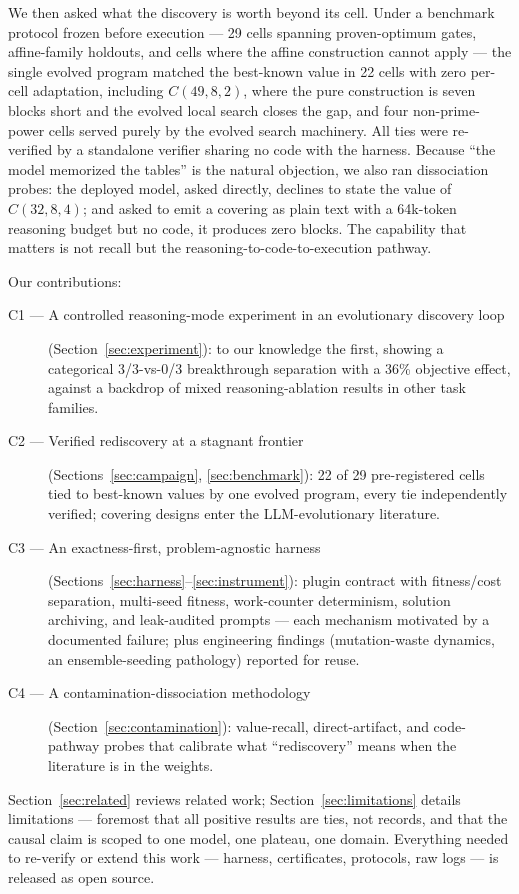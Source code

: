 We then asked what the discovery is worth beyond its cell. Under a
benchmark protocol frozen before execution --- 29 cells spanning
proven-optimum gates, affine-family holdouts, and cells where the
affine construction cannot apply --- the single evolved program
matched the best-known value in 22 cells with zero per-cell
adaptation, including $C(49,8,2)$, where the pure construction is
seven blocks short and the evolved local search closes the gap, and
four non-prime-power cells served purely by the evolved search
machinery. All ties were re-verified by a standalone verifier
sharing no code with the harness. Because ``the model memorized the
tables'' is the natural objection, we also ran dissociation probes:
the deployed model, asked directly, declines to state the value of
$C(32,8,4)$; and asked to emit a covering as plain text with a
64k-token reasoning budget but no code, it produces zero blocks. The
capability that matters is not recall but the
reasoning-to-code-to-execution pathway.

Our contributions:

\begin{description}
\item[C1 --- A controlled reasoning-mode experiment in an evolutionary
discovery loop] (Section~\ref{sec:experiment}): to our knowledge the
first, showing a categorical 3/3-vs-0/3 breakthrough separation with
a 36\% objective effect, against a backdrop of mixed
reasoning-ablation results in other task families.
\item[C2 --- Verified rediscovery at a stagnant frontier]
(Sections~\ref{sec:campaign}, \ref{sec:benchmark}): 22 of 29
pre-registered cells tied to best-known values by one evolved
program, every tie independently verified; covering designs enter the
LLM-evolutionary literature.
\item[C3 --- An exactness-first, problem-agnostic harness]
(Sections~\ref{sec:harness}--\ref{sec:instrument}): plugin contract
with fitness/cost separation, multi-seed fitness, work-counter
determinism, solution archiving, and leak-audited prompts --- each
mechanism motivated by a documented failure; plus engineering
findings (mutation-waste dynamics, an ensemble-seeding pathology)
reported for reuse.
\item[C4 --- A contamination-dissociation methodology]
(Section~\ref{sec:contamination}): value-recall, direct-artifact, and
code-pathway probes that calibrate what ``rediscovery'' means when
the literature is in the weights.
\end{description}

Section~\ref{sec:related} reviews related work;
Section~\ref{sec:limitations} details limitations --- foremost that
all positive results are ties, not records, and that the causal claim
is scoped to one model, one plateau, one domain. Everything needed to
re-verify or extend this work --- harness, certificates, protocols,
raw logs --- is released as open source.

